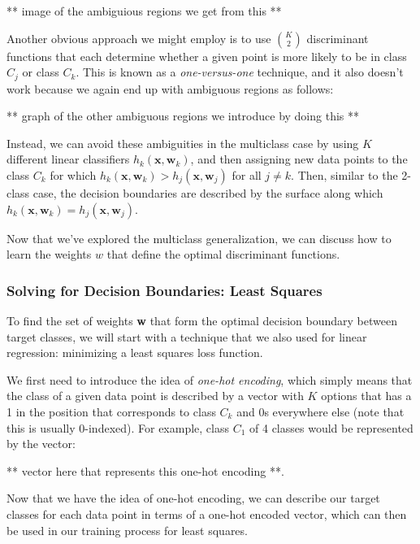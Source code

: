 ** image of the ambiguious regions we get from this **

Another obvious approach we might employ is to use $\binom{K}{2}$ discriminant functions that each determine whether a given point is more likely to be in class $C_{j}$ or class $C_{k}$. This is known as a \textit{one-versus-one} technique, and it also doesn't work because we again end up with ambiguous regions as follows:

** graph of the other ambiguous regions we introduce by doing this **

Instead, we can avoid these ambiguities in the multiclass case by using $K$ different linear classifiers $h_{k}(\textbf{x}, \textbf{w}_{k})$, and then assigning new data points to the class $C_{k}$ for which $h_{k}(\textbf{x}, \textbf{w}_{k}) > h_{j}(\textbf{x}, \textbf{w}_{j})$ for all $j \neq k$. Then, similar to the 2-class case, the decision boundaries are described by the surface along which $h_{k}(\textbf{x}, \textbf{w}_{k}) = h_{j}(\textbf{x}, \textbf{w}_{j})$.

Now that we've explored the multiclass generalization, we can discuss how to learn the weights $w$ that define the optimal discriminant functions.

\subsubsection{Solving for Decision Boundaries: Least Squares}
To find the set of weights \textbf{w} that form the optimal decision boundary between target classes, we will start with a technique that we also used for linear regression: minimizing a least squares loss function.

We first need to introduce the idea of \textit{one-hot encoding}, which simply means that the class of a given data point is described by a vector with $K$ options that has a 1 in the position that corresponds to class $C_{k}$ and 0s everywhere else (note that this is usually 0-indexed). For example, class $C_{1}$ of 4 classes would be represented by the vector:

** vector here that represents this one-hot encoding **.

Now that we have the idea of one-hot encoding, we can describe our target classes for each data point in terms of a one-hot encoded vector, which can then be used in our training process for least squares.

